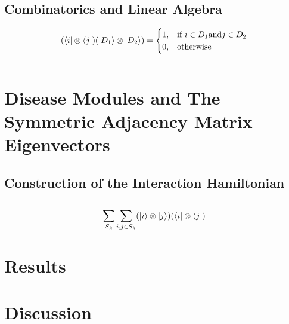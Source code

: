 \documentclass[a4paper,english]{article}
\begin{document}
\subsection{Combinatorics and Linear Algebra}

% 
$$ (\bra{i} \otimes \bra{j}) (\ket{D_1} \otimes \ket{D_2}) = 
\begin{cases}
    1,              & \text{if } i \in  D_1 \text{and}  j \in D_2\\
    0,              & \text{otherwise}
\end{cases}
 $$



%
%

%

$$ $$

\section{Disease Modules and The Symmetric Adjacency Matrix Eigenvectors}


\subsection{Construction of the Interaction Hamiltonian}



\subsection{}
%
%
%

$$ \sum_{S_k} \sum_{i,j \in S_k} (\ket{i} \otimes \ket{j})(\bra{i} \otimes \bra{j})  $$
\subsection{}
\subsection{}


\section{Results}

\section{Discussion}
\end{document}
